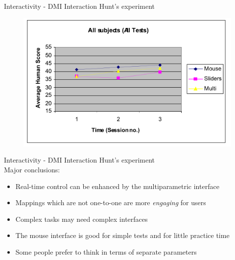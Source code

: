 \documentclass{beamer}
\begin{document}
\begin{frame}{Interactivity - DMI Interaction} 
    Hunt's experiment\\
    \vspace{5mm}
    \begin{figure}[h]
        \includegraphics[width=\textwidth]{hunt2000_result4.png}
    \end{figure}
\end{frame}

\begin{frame}{Interactivity - DMI Interaction} 
    Hunt's experiment\\
    \vspace{5mm}
    Major conclusions:
    \begin{itemize}
        \item Real-time control can be enhanced by the multiparametric interface
        \item Mappings which are not one-to-one are more \textit{engaging} for users
        \item Complex tasks may need complex interfaces
        \item The mouse interface is good for simple tests and for little practice time
        \item Some people prefer to think in terms of separate parameters
    \end{itemize}
\end{frame}
\end{document}
